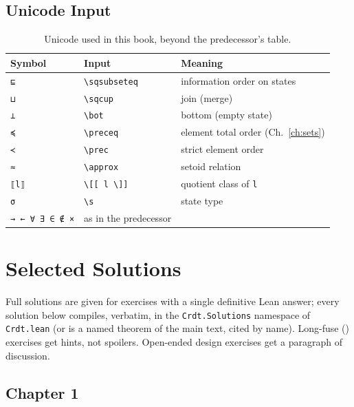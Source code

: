 \documentclass[12pt, a4paper, openright]{book}
\theoremstyle{thmstyle}
\theoremstyle{defstyle}
\newcommand{\lc}[1]{\texttt{#1}}
\newcounter{exercise}[chapter]
\begin{document}
\section{Unicode Input}

\begin{table}[h]
  \centering
  \begin{tabular}{lll}
    \toprule
    Symbol & Input & Meaning \\
    \midrule
    \lc{⊑}  & \texttt{\textbackslash{}sqsubseteq} & information order on states \\
    \lc{⊔}  & \texttt{\textbackslash{}sqcup}      & join (merge) \\
    \lc{⊥}  & \texttt{\textbackslash{}bot}        & bottom (empty state) \\
    \lc{≼}  & \texttt{\textbackslash{}preceq}     & element total order (Ch.~\ref{ch:sets}) \\
    \lc{≺}  & \texttt{\textbackslash{}prec}       & strict element order \\
    \lc{≈}  & \texttt{\textbackslash{}approx}     & setoid relation \\
    \lc{⟦l⟧} & \texttt{\textbackslash{}[[ l \textbackslash{}]]} & quotient class of \lc{l} \\
    \lc{σ}  & \texttt{\textbackslash{}s}          & state type \\
    \lc{→ ← ∀ ∃ ∈ ∉ ×} & as in the predecessor & \\
    \bottomrule
  \end{tabular}
  \caption{Unicode used in this book, beyond the predecessor's table.}
\end{table}

\chapter{Selected Solutions}
\label{app:solutions}

Full solutions are given for exercises with a single definitive Lean
answer; every solution below compiles, verbatim, in the
\lc{Crdt.Solutions} namespace of \texttt{Crdt.lean} (or is a named
theorem of the main text, cited by name). Long-fuse
() exercises get hints, not spoilers.
Open-ended design exercises get a paragraph of discussion.

\section*{Chapter 1}
\end{document}
